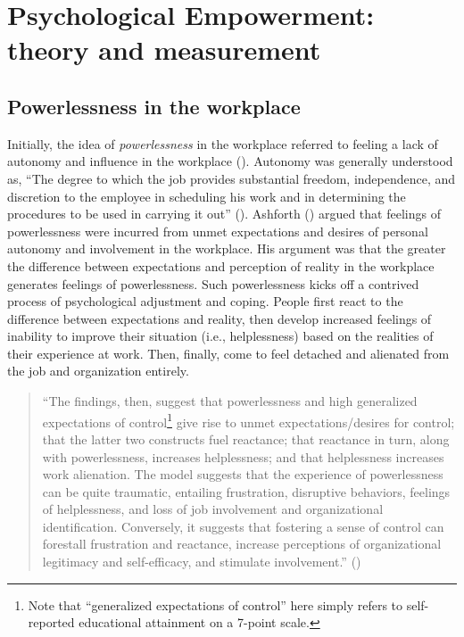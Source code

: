 \documentclass[
  11pt,
  a4paper,
]{article}
\begin{document}
\section{Psychological Empowerment: theory and
measurement}\label{psychological-empowerment-theory-and-measurement}

\subsection{Powerlessness in the
workplace}\label{powerlessness-in-the-workplace}

Initially, the idea of \emph{powerlessness} in the workplace referred to
feeling a lack of autonomy and influence in the workplace
(). Autonomy was generally
understood as, ``The degree to which the job provides substantial
freedom, independence, and discretion to the employee in scheduling his
work and in determining the procedures to be used in carrying it out''
(). Ashforth
() argued that feelings of
powerlessness were incurred from unmet expectations and desires of
personal autonomy and involvement in the workplace. His argument was
that the greater the difference between expectations and perception of
reality in the workplace generates feelings of powerlessness. Such
powerlessness kicks off a contrived process of psychological adjustment
and coping. People first react to the difference between expectations
and reality, then develop increased feelings of inability to improve
their situation (i.e., helplessness) based on the realities of their
experience at work. Then, finally, come to feel detached and alienated
from the job and organization entirely.

\begin{quote}
``The findings, then, suggest that powerlessness and high generalized
expectations of control\footnote{Note that ``generalized expectations of
  control'' here simply refers to self-reported educational attainment
  on a 7-point scale.} give rise to unmet expectations/desires for
control; that the latter two constructs fuel reactance; that reactance
in turn, along with powerlessness, increases helplessness; and that
helplessness increases work alienation. The model suggests that the
experience of powerlessness can be quite traumatic, entailing
frustration, disruptive behaviors, feelings of helplessness, and loss of
job involvement and organizational identification. Conversely, it
suggests that fostering a sense of control can forestall frustration and
reactance, increase perceptions of organizational legitimacy and
self-efficacy, and stimulate involvement.''
()
\end{quote}
\end{document}
